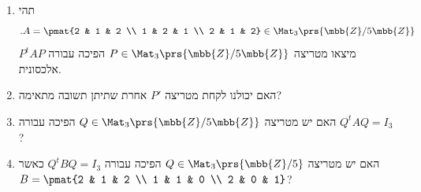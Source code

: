 \documentclass[a4paper,10pt,twoside,openany]{book}
\begin{document}
\begin{exercisechap}
\begin{enumerate}
    \item תהי
\[\text{.} A = \pmat{2 & 1 & 2 \\ 1 & 2 & 1 \\ 2 & 1 & 2} \in \Mat_3\prs{\mbb{Z}/5\mbb{Z}}\]
מיצאו מטריצה
$P \in \Mat_3\prs{\mbb{Z}/5\mbb{Z}}$
הפיכה
עבורה
$P^t A P$
אלכסונית.

\item האם יכולנו לקחת מטריצה
$P'$
אחרת שתיתן תשובה מתאימה?

\item האם יש מטריצה
$Q \in \Mat_3\prs{\mbb{Z}/5\mbb{Z}}$
הפיכה עבורה
$Q^t A Q = I_3$?

\item האם יש מטריצה
$Q \in \Mat_3\prs{\mbb{Z}/5}$
הפיכה עבורה
$Q^t B Q = I_3$
כאשר
$B = \pmat{2 & 1 & 2 \\ 1 & 1 & 0 \\ 2 & 0 & 1}$?
\end{enumerate}
\end{exercisechap}
\end{document}
